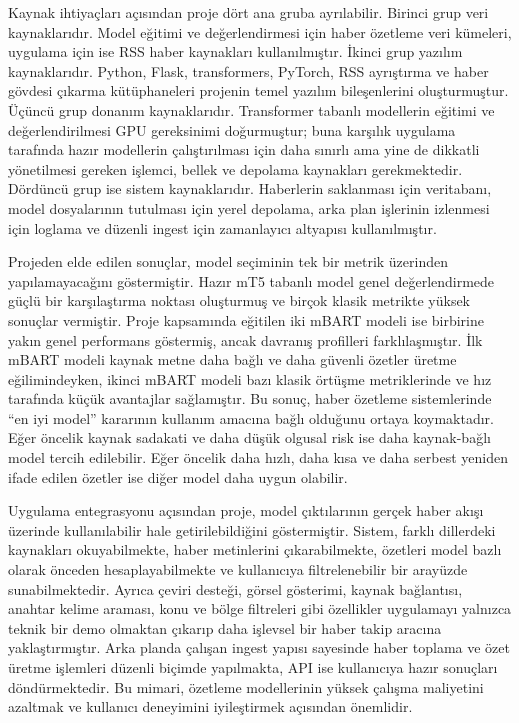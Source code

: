 Kaynak ihtiyaçları açısından proje dört ana gruba ayrılabilir. Birinci grup veri kaynaklarıdır. Model eğitimi ve değerlendirmesi için haber özetleme veri kümeleri, uygulama için ise RSS haber kaynakları kullanılmıştır. İkinci grup yazılım kaynaklarıdır. Python, Flask, transformers, PyTorch, RSS ayrıştırma ve haber gövdesi çıkarma kütüphaneleri projenin temel yazılım bileşenlerini oluşturmuştur. Üçüncü grup donanım kaynaklarıdır. Transformer tabanlı modellerin eğitimi ve değerlendirilmesi GPU gereksinimi doğurmuştur; buna karşılık uygulama tarafında hazır modellerin çalıştırılması için daha sınırlı ama yine de dikkatli yönetilmesi gereken işlemci, bellek ve depolama kaynakları gerekmektedir. Dördüncü grup ise sistem kaynaklarıdır. Haberlerin saklanması için veritabanı, model dosyalarının tutulması için yerel depolama, arka plan işlerinin izlenmesi için loglama ve düzenli ingest için zamanlayıcı altyapısı kullanılmıştır.

Projeden elde edilen sonuçlar, model seçiminin tek bir metrik üzerinden yapılamayacağını göstermiştir. Hazır mT5 tabanlı model genel değerlendirmede güçlü bir karşılaştırma noktası oluşturmuş ve birçok klasik metrikte yüksek sonuçlar vermiştir. Proje kapsamında eğitilen iki mBART modeli ise birbirine yakın genel performans göstermiş, ancak davranış profilleri farklılaşmıştır. İlk mBART modeli kaynak metne daha bağlı ve daha güvenli özetler üretme eğilimindeyken, ikinci mBART modeli bazı klasik örtüşme metriklerinde ve hız tarafında küçük avantajlar sağlamıştır. Bu sonuç, haber özetleme sistemlerinde “en iyi model” kararının kullanım amacına bağlı olduğunu ortaya koymaktadır. Eğer öncelik kaynak sadakati ve daha düşük olgusal risk ise daha kaynak-bağlı model tercih edilebilir. Eğer öncelik daha hızlı, daha kısa ve daha serbest yeniden ifade edilen özetler ise diğer model daha uygun olabilir.

Uygulama entegrasyonu açısından proje, model çıktılarının gerçek haber akışı üzerinde kullanılabilir hale getirilebildiğini göstermiştir. Sistem, farklı dillerdeki kaynakları okuyabilmekte, haber metinlerini çıkarabilmekte, özetleri model bazlı olarak önceden hesaplayabilmekte ve kullanıcıya filtrelenebilir bir arayüzde sunabilmektedir. Ayrıca çeviri desteği, görsel gösterimi, kaynak bağlantısı, anahtar kelime araması, konu ve bölge filtreleri gibi özellikler uygulamayı yalnızca teknik bir demo olmaktan çıkarıp daha işlevsel bir haber takip aracına yaklaştırmıştır. Arka planda çalışan ingest yapısı sayesinde haber toplama ve özet üretme işlemleri düzenli biçimde yapılmakta, API ise kullanıcıya hazır sonuçları döndürmektedir. Bu mimari, özetleme modellerinin yüksek çalışma maliyetini azaltmak ve kullanıcı deneyimini iyileştirmek açısından önemlidir.

